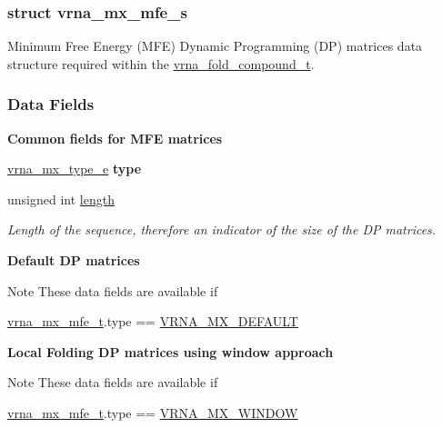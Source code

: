 \subsubsection{struct vrna\+\_\+mx\+\_\+mfe\+\_\+s}
Minimum Free Energy (M\+FE) Dynamic Programming (DP) matrices data structure required within the \hyperlink{group__fold__compound_ga1b0cef17fd40466cef5968eaeeff6166}{vrna\+\_\+fold\+\_\+compound\+\_\+t}. \subsubsection*{Data Fields}
\begin{Indent}{\bf Common fields for M\+FE matrices}\par
\begin{DoxyCompactItemize}
\item 
\hyperlink{group__dp__matrices_ga6042ea1d58d01931e959791be6d89343}{vrna\+\_\+mx\+\_\+type\+\_\+e} {\bfseries type}\hypertarget{group__dp__matrices_a468680aa937b664d453075108d976ae2}{}\label{group__dp__matrices_a468680aa937b664d453075108d976ae2}

\item 
unsigned int \hyperlink{group__dp__matrices_a1f92a8406fc1fb721dbf9193c34ad826}{length}\hypertarget{group__dp__matrices_a1f92a8406fc1fb721dbf9193c34ad826}{}\label{group__dp__matrices_a1f92a8406fc1fb721dbf9193c34ad826}

\begin{DoxyCompactList}\small\item\em Length of the sequence, therefore an indicator of the size of the DP matrices. \end{DoxyCompactList}\end{DoxyCompactItemize}
\end{Indent}
\begin{Indent}{\bf Default DP matrices}\par
{\em \begin{DoxyNote}{Note}
These data fields are available if 
\begin{DoxyCode}
\hyperlink{group__dp__matrices_structvrna__mx__mfe__s}{vrna\_mx\_mfe\_t}.type == \hyperlink{group__dp__matrices_gga6042ea1d58d01931e959791be6d89343aafa2568956dab79595521e20c49a5f75}{VRNA\_MX\_DEFAULT} 
\end{DoxyCode}
 
\end{DoxyNote}
}\end{Indent}
\begin{Indent}{\bf Local Folding DP matrices using window approach}\par
{\em \begin{DoxyNote}{Note}
These data fields are available if 
\begin{DoxyCode}
\hyperlink{group__dp__matrices_structvrna__mx__mfe__s}{vrna\_mx\_mfe\_t}.type == \hyperlink{group__dp__matrices_gga6042ea1d58d01931e959791be6d89343a2ea5d5947f6ec02544934b0ff2785e99}{VRNA\_MX\_WINDOW} 
\end{DoxyCode}
 
\end{DoxyNote}
}\end{Indent}
